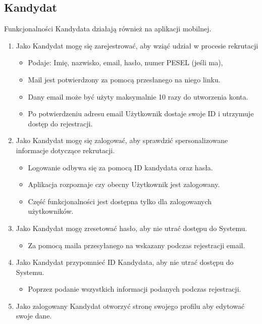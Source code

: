 \documentclass{article}
\begin{document}
\subsection{Kandydat}
Funkcjonalności Kandydata działają również na aplikacji mobilnej.
\begin{enumerate}
    \item Jako Kandydat mogę się zarejestrować, aby wziąć udział w procesie rekrutacji  
        \begin{itemize}
        \item Podaje: Imię, nazwisko, email, hasło, numer PESEL (jeśli ma),
        \item Mail jest potwierdzony za pomocą przesłanego na niego linku.
        \item Dany email może być użyty maksymalnie 10 razy do utworzenia konta.
        \item Po potwierdzeniu adresu email Użytkownik dostaje swoje ID i utrzymuje dostęp do rejestracji.
        \end{itemize}
    \item Jako Kandydat mogę się zalogować, aby sprawdzić spersonalizowane informacje dotyczące rekrutacji.
        \begin{itemize}
        \item Logowanie odbywa się za pomocą ID kandydata oraz hasła.
        \item Aplikacja rozpoznaje czy obecny Użytkownik jest zalogowany.
        \item Część funkcjonalności jest dostępna tylko dla zalogowanych użytkowników.
        \end{itemize}
    \item Jako Kandydat mogę zresetować hasło, aby nie utrać dostępu do Systemu.    
        \begin{itemize}
        \item Za pomocą maila przesyłanego na wskazany  podczas rejestracji email.
        \end{itemize}
    \item Jako Kandydat przypomnieć ID Kandydata, aby nie utrać dostępu do Systemu. 
        \begin{itemize}
        \item Poprzez podanie wszystkich informacji podanych podczas rejestracji.
        \end{itemize}
    \item Jako zalogowany Kandydat otworzyć stronę swojego profilu aby edytować swoje dane.   
        \begin{itemize}

\end{itemize}
\end{enumerate}
\end{document}
